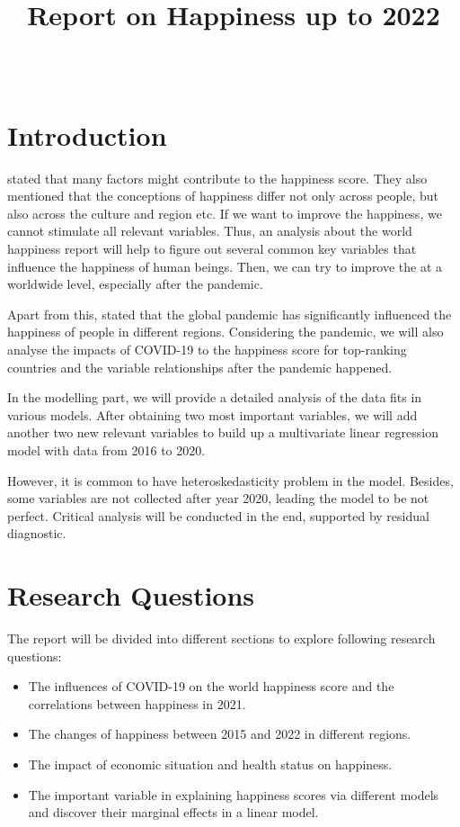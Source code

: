 \documentclass[11pt,a4paper,]{article}
\title{Report on Happiness up to 2022}
\author{\sf{\Large\textbf{(Elvis) Zhixiang Yang}\\\large EBS Honours Student\\[0.5cm]}{\Large\textbf{Yiqi Wang}\\\large Master of BA Student\\[0.5cm]}{\Large\textbf{Xintong You}\\\large Master of BA Student\\[0.5cm]}}
\date{\sf\Date~\Month~\Year}
\makeatletter
\def\titlepage{\front{\expandafter{\@title}}{\@author}{\@organization}}
\makeatother
\begin{document}
\titlepage

{
\setcounter{tocdepth}{2}
\tableofcontents
}
\clearpage

\hypertarget{introduction}{%
\section{Introduction}\label{introduction}}

\textcite{rojas2010} stated that many factors might contribute to the happiness score. They also mentioned that the conceptions of happiness differ not only across people, but also across the culture and region etc. If we want to improve the happiness, we cannot stimulate all relevant variables. Thus, an analysis about the world happiness report will help to figure out several common key variables that influence the happiness of human beings. Then, we can try to improve the at a worldwide level, especially after the pandemic.

Apart from this, \textcite{helliwell2021world} stated that the global pandemic has significantly influenced the happiness of people in different regions. Considering the pandemic, we will also analyse the impacts of COVID-19 to the happiness score for top-ranking countries and the variable relationships after the pandemic happened.

In the modelling part, we will provide a detailed analysis of the data fits in various models. After obtaining two most important variables, we will add another two new relevant variables to build up a multivariate linear regression model with data from 2016 to 2020.

However, it is common to have heteroskedasticity problem in the model. Besides, some variables are not collected after year 2020, leading the model to be not perfect. Critical analysis will be conducted in the end, supported by residual diagnostic.

\hypertarget{research-questions}{%
\section{Research Questions}\label{research-questions}}

The report will be divided into different sections to explore following research questions:

\begin{itemize}
\item
  The influences of COVID-19 on the world happiness score and the correlations between happiness in 2021.
\item
  The changes of happiness between 2015 and 2022 in different regions.
\item
  The impact of economic situation and health status on happiness.
\item
  The important variable in explaining happiness scores via different models and discover their marginal effects in a linear model.
\end{itemize}
\end{document}
